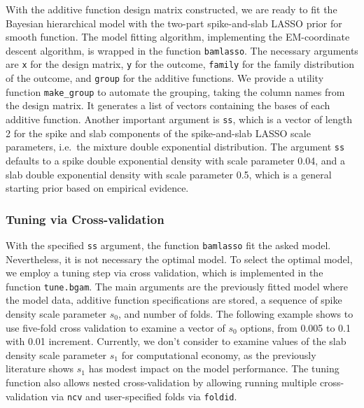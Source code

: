 \documentclass[
]{jss}
\begin{document}
With the additive function design matrix constructed, we are ready to
fit the Bayesian hierarchical model with the two-part spike-and-slab
LASSO prior for smooth function. The model fitting algorithm,
implementing the EM-coordinate descent algorithm, is wrapped in the
function \texttt{bamlasso}. The necessary arguments are \texttt{x} for
the design matrix, \texttt{y} for the outcome, \texttt{family} for the
family distribution of the outcome, and \texttt{group} for the additive
functions. We provide a utility function \texttt{make\_group} to
automate the grouping, taking the column names from the design matrix.
It generates a list of vectors containing the bases of each additive
function. Another important argument is \texttt{ss}, which is a vector
of length 2 for the spike and slab components of the spike-and-slab
LASSO scale parameters, i.e.~the mixture double exponential
distribution. The argument \texttt{ss} defaults to a spike double
exponential density with scale parameter 0.04, and a slab double
exponential density with scale parameter 0.5, which is a general
starting prior based on empirical evidence.

\begin{CodeChunk}
\end{CodeChunk}

\subsubsection{Tuning via Cross-validation}

With the specified \texttt{ss} argument, the function \texttt{bamlasso}
fit the asked model. Nevertheless, it is not necessary the optimal
model. To select the optimal model, we employ a tuning step via cross
validation, which is implemented in the function \texttt{tune.bgam}. The
main arguments are the previously fitted model where the model data,
additive function specifications are stored, a sequence of spike density
scale parameter \(s_0\), and number of folds. The following example
shows to use five-fold cross validation to examine a vector of \(s_0\)
options, from 0.005 to 0.1 with 0.01 increment. Currently, we don't
consider to examine values of the slab density scale parameter \(s_1\)
for computational economy, as the previously literature shows \(s_1\)
has modest impact on the model performance. The tuning function also
allows nested cross-validation by allowing running multiple
cross-validation via \texttt{ncv} and user-specified folds via
\texttt{foldid}.
\end{document}
